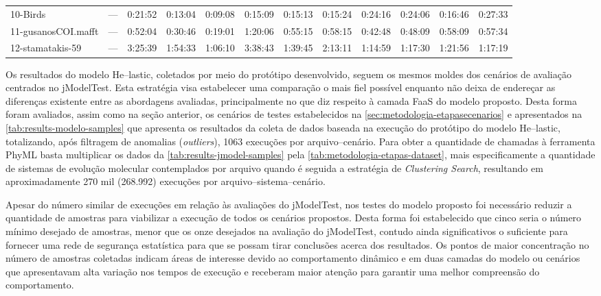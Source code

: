 \documentclass[english,brazilian]{UNISINOSmonografia} %
\begin{document}
{\begin{landscape}
\begin{table}[tbp]
\begin{minipage}{\linewidth}
\begin{tabularx}{\textwidth}{@{\extracolsep{\fill}}lWWWWWWWWWWW@{}}
		10-Birds & --- & 0:21:52 & 0:13:04 & 0:09:08 & 0:15:09 & 0:15:13 & 0:15:24 & 0:24:16 & 0:24:06 & 0:16:46 & 0:27:33 \\
		11-gusanosCOI.mafft & --- & 0:52:04 & 0:30:46 & 0:19:01 & 1:20:06 & 0:55:15 & 0:58:15 & 0:42:48 & 0:48:09 & 0:58:09 & 0:57:34 \\
		12-stamatakis-59 & --- & 3:25:39 & 1:54:33 & 1:06:10 & 3:38:43 & 1:39:45 & 2:13:11 & 1:14:59 & 1:17:30 & 1:21:56 & 1:17:19 \\ 
		\bottomrule
	\end{tabularx}
\end{minipage}
\end{table}
\end{landscape}
}


Os resultados do modelo \textsf{He}--lastic, coletados por meio do protótipo desenvolvido, seguem os mesmos moldes dos cenários de avaliação centrados no jModelTest.
%
Esta estratégia visa estabelecer uma comparação o mais fiel possível enquanto não deixa de endereçar as diferenças existente entre as abordagens avaliadas, principalmente no que diz respeito à camada FaaS do modelo proposto.
%
Desta forma foram avaliados, assim como na seção anterior, os cenários de testes estabelecidos na \autoref{sec:metodologia-etapasecenarios}
e apresentados na \autoref{tab:results-modelo-samples} que apresenta os resultados da coleta de dados baseada na execução do protótipo do modelo \textsf{He}--lastic, totalizando, após filtragem de anomalias (\textit{outliers}), 1063 execuções por arquivo--cenário.
%
Para obter a quantidade de chamadas à ferramenta PhyML basta multiplicar os dados da \autoref{tab:results-jmodel-samples} pela \autoref{tab:metodologia-etapas-dataset}, mais especificamente a quantidade de sistemas de evolução molecular contemplados por arquivo quando é seguida a estratégia de \textit{Clustering Search}, resultando em aproximadamente 270 mil (268.992) execuções por arquivo--sistema--cenário.


Apesar do número similar de execuções em relação às avaliações do jModelTest, nos testes do modelo proposto foi necessário reduzir a quantidade de amostras para viabilizar a execução de todos os cenários propostos.
%
Desta forma foi estabelecido que cinco seria o número mínimo desejado de amostras, menor que os onze desejados na avaliação do jModelTest, contudo ainda significativos o suficiente para fornecer uma rede de segurança estatística para que se possam tirar conclusões acerca dos resultados.
%
Os pontos de maior concentração no número de amostras coletadas indicam áreas de interesse devido ao comportamento dinâmico e em duas camadas do modelo ou cenários que apresentavam alta variação nos tempos de execução e receberam maior atenção para garantir uma melhor compreensão do comportamento.
\end{document}
